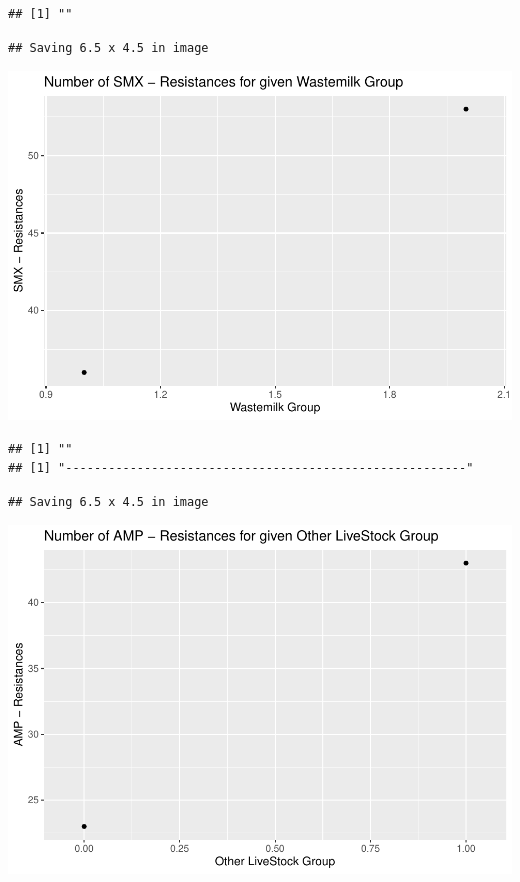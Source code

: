 \documentclass[
]{article}
\begin{document}
\begin{verbatim}
## [1] ""
\end{verbatim}

\begin{verbatim}
## Saving 6.5 x 4.5 in image
\end{verbatim}

\includegraphics{NResistenzen_files/figure-latex/binary_or_nominal_variables-10.pdf}

\begin{verbatim}
## [1] ""
## [1] "--------------------------------------------------------"
\end{verbatim}

\begin{verbatim}
## Saving 6.5 x 4.5 in image
\end{verbatim}

\includegraphics{NResistenzen_files/figure-latex/binary_or_nominal_variables-11.pdf}
\end{document}
